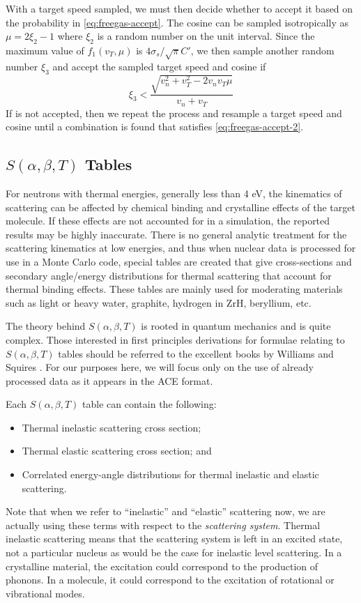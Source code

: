 With a target speed sampled, we must then decide whether to accept it based on
the probability in \eqref{eq:freegas-accept}. The cosine can be sampled
isotropically as $\mu = 2\xi_2 - 1$ where $\xi_2$ is a random number on the unit
interval. Since the maximum value of $f_1(v_T, \mu)$ is $4\sigma_s / \sqrt{\pi}
C'$, we then sample another random number $\xi_3$ and accept the sampled target
speed and cosine if
\begin{equation}
  \label{eq:freegas-accept-2}
  \xi_3 < \frac{\sqrt{v_n^2 + v_T^2 - 2 v_n v_T \mu}}{v_n + v_T}
\end{equation}
If is not accepted, then we repeat the process and resample a target speed and
cosine until a combination is found that satisfies \eqref{eq:freegas-accept-2}.

\subsection{$S(\alpha,\beta,T)$ Tables}

For neutrons with thermal energies, generally less than 4 eV, the kinematics of
scattering can be affected by chemical binding and crystalline effects of the
target molecule. If these effects are not accounted for in a simulation, the
reported results may be highly inaccurate. There is no general analytic
treatment for the scattering kinematics at low energies, and thus when nuclear
data is processed for use in a Monte Carlo code, special tables are created that
give cross-sections and secondary angle/energy distributions for thermal
scattering that account for thermal binding effects. These tables are mainly
used for moderating materials such as light or heavy water, graphite, hydrogen
in ZrH, beryllium, etc.

The theory behind $S(\alpha,\beta,T)$ is rooted in quantum mechanics and is
quite complex. Those interested in first principles derivations for formulae
relating to $S(\alpha,\beta,T)$ tables should be referred to the excellent books
by Williams \cite{Williams-1966} and Squires \cite{squires-1978}. For our
purposes here, we will focus only on the use of already processed data as it
appears in the ACE format.

Each $S(\alpha,\beta,T)$ table can contain the following:
\begin{itemize}
\item Thermal inelastic scattering cross section;
\item Thermal elastic scattering cross section; and
\item Correlated energy-angle distributions for thermal inelastic and elastic
  scattering.
\end{itemize}
Note that when we refer to ``inelastic'' and ``elastic'' scattering now, we are
actually using these terms with respect to the \emph{scattering system}. Thermal
inelastic scattering means that the scattering system is left in an excited
state, not a particular nucleus as would be the case for inelastic level
scattering. In a crystalline material, the excitation could correspond to the
production of phonons. In a molecule, it could correspond to the excitation of
rotational or vibrational modes.

